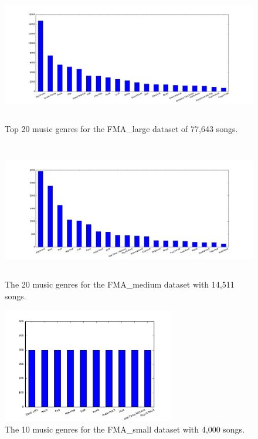 \documentclass{article}
\begin{document}
\begin{figure}[h!]
\centering
\includegraphics[height=6cm]{histo_large.pdf}
\vspace{-0.5cm}
\caption{Top 20 music genres for the FMA\_large dataset of 77,643 songs.}
\label{fig_large}
\end{figure}






\begin{figure}[h!]
\centering
\includegraphics[height=6cm]{histo_medium.pdf}
\vspace{-0.5cm}
\caption{The 20 music genres for the FMA\_medium dataset with 14,511 songs.}
\label{fig_medium}
\end{figure}


\begin{figure}[h!]
\centering
\includegraphics[height=5cm]{histo_small.pdf}
\vspace{-0.5cm}
\caption{The 10 music genres for the FMA\_small dataset with 4,000 songs.}
\label{fig_small}
\end{figure}
\end{document}
